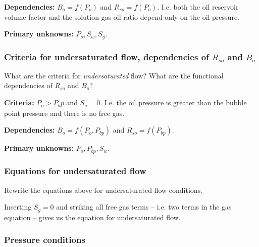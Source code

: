 \noindent \textbf{Dependencies:} $B_o=f(P_o)$ and $R_{so}=f(P_o)$. I.e. both the oil reservoir volume factor and the solution gas-oil ratio depend only on the oil pressure.

\noindent \textbf{Primary unknowns:} $P_o, S_w, S_g$.

\subsubsection{Criteria for undersaturated flow, dependencies of $R_{so}$ and $B_o$} %
\label{ssub:criteria_for_undersaturated_flow_dependencies_of_r__so_and_b_o_}

\begin{question}
  What are the criteria for \emph{undersaturated} flow? What are the functional dependencies of $R_{so}$ and $B_o$?
\end{question}

\noindent \textbf{Criteria:} $P_o > P_bp$ and $S_g = 0$. I.e. the oil pressure is greater than the bubble point pressure and there is no free gas.

\noindent \textbf{Dependencies:} $B_o = f(P_o, P_{bp})$ and $R_{so} = f(P_{bp})$.

\noindent \textbf{Primary unknowns:} $P_o, P_{bp}, S_w$.


\subsubsection{Equations for undersaturated flow} %
\label{ssub:equations_for_undersaturated_flow}

\begin{question}
  Rewrite the equations above for undersaturated flow conditions.
\end{question}

Inserting $S_g = 0$ and striking all free gas terms -- i.e. two terms in the gas equation -- gives us the equation for undersaturated flow.


\subsubsection{Pressure conditions} %
\label{ssub:pressure_conditions}

